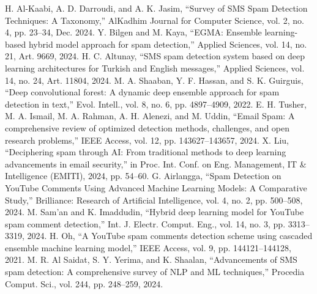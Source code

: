 \documentclass{article}
\begin{document}
\newline
[10] H. Al-Kaabi, A. D. Darroudi, and A. K. Jasim, “Survey of SMS Spam Detection Techniques: A Taxonomy,” AlKadhim Journal for Computer Science, vol. 2, no. 4, pp. 23–34, Dec. 2024.
\newline
\newline
[11] Y. Bilgen and M. Kaya, “EGMA: Ensemble learning-based hybrid model approach for spam detection,” Applied Sciences, vol. 14, no. 21, Art. 9669, 2024.
\newline
\newline
[12] H. C. Altunay, “SMS spam detection system based on deep learning architectures for Turkish and English messages,” Applied Sciences, vol. 14, no. 24, Art. 11804, 2024.
\newline
\newline
[13] M. A. Shaaban, Y. F. Hassan, and S. K. Guirguis, “Deep convolutional forest: A dynamic deep ensemble approach for spam detection in text,” Evol. Intell., vol. 8, no. 6, pp. 4897–4909, 2022.
\newline
\newline
[14] E. H. Tusher, M. A. Ismail, M. A. Rahman, A. H. Alenezi, and M. Uddin, “Email Spam: A comprehensive review of optimized detection methods, challenges, and open research problems,” IEEE Access, vol. 12, pp. 143627–143657, 2024.
\newline
\newline
[15] X. Liu, “Deciphering spam through AI: From traditional methods to deep learning advancements in email security,” in Proc. Int. Conf. on Eng. Management, IT \& Intelligence (EMITI), 2024, pp. 54–60.
\newline
\newline
[16] G. Airlangga, “Spam Detection on YouTube Comments Using Advanced Machine Learning Models: A Comparative Study,” Brilliance: Research of Artificial Intelligence, vol. 4, no. 2, pp. 500–508, 2024.
\newline
\newline
[17] M. Sam’an and K. Imaddudin, “Hybrid deep learning model for YouTube spam comment detection,” Int. J. Electr. Comput. Eng., vol. 14, no. 3, pp. 3313–3319, 2024.
\newline
\newline
[18] H. Oh, “A YouTube spam comments detection scheme using cascaded ensemble machine learning model,” IEEE Access, vol. 9, pp. 144121–144128, 2021.
\newline
\newline
[19] M. R. Al Saidat, S. Y. Yerima, and K. Shaalan, “Advancements of SMS spam detection: A comprehensive survey of NLP and ML techniques,” Procedia Comput. Sci., vol. 244, pp. 248–259, 2024.
\end{document}
